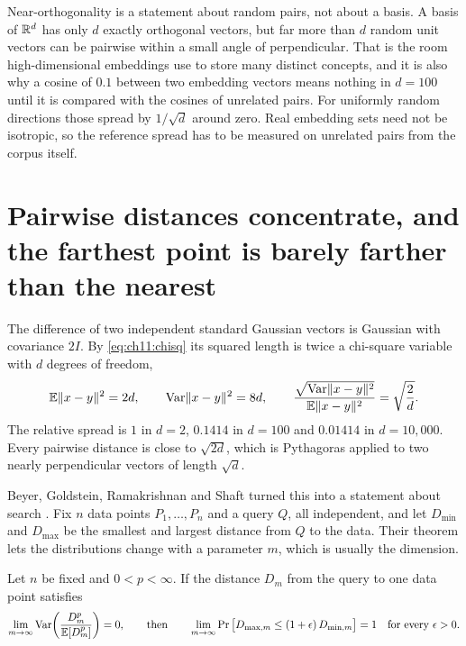 Near-orthogonality is a statement about random pairs, not about a basis. A basis of $\mathbb{R}^d$ has only $d$ exactly orthogonal vectors, but far more than $d$ random unit vectors can be pairwise within a small angle of perpendicular. That is the room high-dimensional embeddings use to store many distinct concepts, and it is also why a cosine of $0.1$ between two embedding vectors means nothing in $d=100$ until it is compared with the cosines of unrelated pairs. For uniformly random directions those spread by $1/\sqrt d$ around zero. Real embedding sets need not be isotropic, so the reference spread has to be measured on unrelated pairs from the corpus itself.


\section{Pairwise distances concentrate, and the farthest point is barely farther than the nearest}\label{sec:ch11:dist}

The difference of two independent standard Gaussian vectors is Gaussian with covariance $2I$. By \cref{eq:ch11:chisq} its squared length is twice a chi-square variable with $d$ degrees of freedom,
\begin{equation}\label{eq:ch11:pair}
\mathbb{E}\lVert x-y\rVert^2=2d,\qquad \operatorname{Var}\lVert x-y\rVert^2=8d,\qquad
\frac{\sqrt{\operatorname{Var}\lVert x-y\rVert^2}}{\mathbb{E}\lVert x-y\rVert^2}=\sqrt{\frac2d}.
\end{equation}
The relative spread is $1$ in $d=2$, $0.1414$ in $d=100$ and $0.01414$ in $d=10{,}000$. Every pairwise distance is close to $\sqrt{2d}$, which is Pythagoras applied to two nearly perpendicular vectors of length $\sqrt d$.

Beyer, Goldstein, Ramakrishnan and Shaft turned this into a statement about search \cite{beyer1999}. Fix $n$ data points $P_1,\dots,P_n$ and a query $Q$, all independent, and let $D_{\min}$ and $D_{\max}$ be the smallest and largest distance from $Q$ to the data. Their theorem lets the distributions change with a parameter $m$, which is usually the dimension.

\begin{theorem}\label{thm:ch11:beyer}
Let $n$ be fixed and $0<p<\infty$. If the distance $D_m$ from the query to one data point satisfies
\begin{equation}\label{eq:ch11:beyer}
\lim_{m\to\infty}\operatorname{Var}\!\left(\frac{D_m^p}{\mathbb{E}[D_m^p]}\right)=0,
\qquad\text{then}\qquad
\lim_{m\to\infty}\Pr\big[D_{\max,m}\le(1+\epsilon)\,D_{\min,m}\big]=1\quad\text{for every }\epsilon>0.
\end{equation}
\end{theorem}

